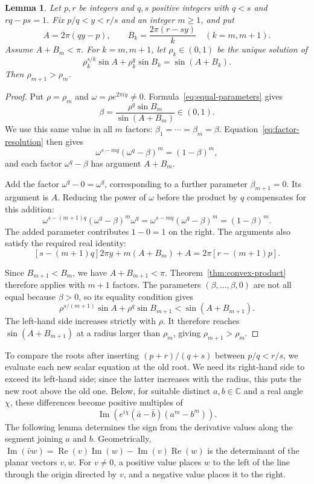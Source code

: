 \documentclass[11pt,a4paper]{article}
\newtheorem{lemma}[theorem]{Lemma}
\theoremstyle{definition}
\theoremstyle{remark}
\numberwithin{equation}{section}
\begin{document}
\begin{lemma}\label{lem:add-factor}
Let $p,r$ be integers and $q,s$ positive integers with $q<s$ and $rq-ps=1$. Fix $p/q<y<r/s$ and an integer $m\ge1$, and put
\[
 A=2\pi(qy-p),\qquad B_k=\frac{2\pi(r-sy)}{k}
 \quad(k=m,m+1).
\]
Assume $A+B_m<\pi$. For $k=m,m+1$, let $\rho_k\in(0,1)$ be the unique solution of
\[
 \rho_k^{s/k}\sin A+\rho_k^q\sin B_k=\sin(A+B_k).
\]
Then $\rho_{m+1}>\rho_m$.
\end{lemma}
\begin{proof}
Put $\rho=\rho_m$ and $\omega=\rho e^{2\pi i y}\ne0$. Formula~\eqref{eq:equal-parameters} gives
\[
 \beta=\frac{\rho^q\sin B_m}{\sin(A+B_m)}\in(0,1).
\]
We use this same value in all $m$ factors: $\beta_1=\cdots=\beta_m=\beta$. Equation~\eqref{eq:factor-resolution} then gives
\[
 \omega^{s-mq}(\omega^q-\beta)^m=(1-\beta)^m,
\]
and each factor $\omega^q-\beta$ has argument $A+B_m$.

Add the factor $\omega^q-0=\omega^q$, corresponding to a further parameter $\beta_{m+1}=0$. Its argument is $A$. Reducing the power of $\omega$ before the product by $q$ compensates for this addition:
\[
 \omega^{s-(m+1)q}(\omega^q-\beta)^m\omega^q
 =\omega^{s-mq}(\omega^q-\beta)^m=(1-\beta)^m.
\]
The added parameter contributes $1-0=1$ on the right. The arguments also satisfy the required real identity:
\[
 [s-(m+1)q]2\pi y+m(A+B_m)+A=2\pi[r-(m+1)p].
\]

Since $B_{m+1}<B_m$, we have $A+B_{m+1}<\pi$. Theorem~\ref{thm:convex-product} therefore applies with $m+1$ factors. The parameters $(\beta,\ldots,\beta,0)$ are not all equal because $\beta>0$, so its equality condition gives
\[
 \rho^{s/(m+1)}\sin A+\rho^q\sin B_{m+1}
 <\sin(A+B_{m+1}).
\]
The left-hand side increases strictly with $\rho$. It therefore reaches $\sin(A+B_{m+1})$ at a radius larger than $\rho_m$, giving $\rho_{m+1}>\rho_m$.
\end{proof}

To compare the roots after inserting $(p+r)/(q+s)$ between $p/q<r/s$, we evaluate each new scalar equation at the old root. We need its right-hand side to exceed its left-hand side; since the latter increases with the radius, this puts the new root above the old one. Below, for suitable distinct $a,b\in\mathbb C$ and a real angle $\chi$, these differences become positive multiples of
\[
 \operatorname{Im}\!\left(e^{i\chi}(\bar a-\bar b)(a^m-b^m)\right).
\]
The following lemma determines the sign from the derivative values along the segment joining $a$ and $b$. Geometrically, $\operatorname{Im}(\bar v w)=\operatorname{Re}(v)\operatorname{Im}(w)-\operatorname{Im}(v)\operatorname{Re}(w)$ is the determinant of the planar vectors $v,w$. For $v\ne0$, a positive value places $w$ to the left of the line through the origin directed by $v$, and a negative value places it to the right.
\end{document}
